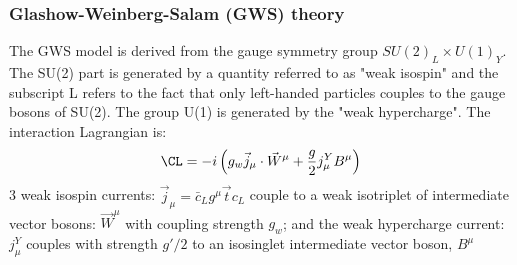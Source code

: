 \subsubsection{Glashow-Weinberg-Salam (GWS) theory}
The GWS model is derived from the gauge symmetry group $SU(2)_L \times U(1)_Y$.
The SU(2) part is generated by a quantity referred to as "weak isospin" and the
subscript L refers to the fact that only left-handed particles couples to the
gauge bosons of SU(2). The group U(1) is generated by the "weak hypercharge".
The interaction Lagrangian is:
$$ \CL = -i \left( g_w \vec{j}_\mu\cdot \vec{W}^\mu + \frac{g}{2}j_\mu^Y B^\mu \right)$$
3 weak isospin currents: $\vec{j}_\mu = \bar{c}_L g^\mu \vec{t} c_L $ couple to
a weak isotriplet of intermediate vector bosons: $\vec{W}^\mu$ with coupling 
strength $g_w$; and the weak hypercharge current: $j_\mu^Y$ couples with strength
$g'/2$ to an isosinglet intermediate vector boson, $B^\mu$

